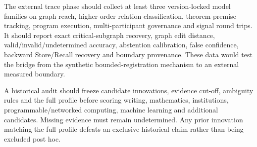 \documentclass[10pt]{article}
\begin{document}
The external trace phase should collect at least three version-locked model families on graph reach, higher-order relation classification, theorem-premise tracking, program execution, multi-participant governance and signal round trips. It should report exact critical-subgraph recovery, graph edit distance, valid/invalid/undetermined accuracy, abstention calibration, false confidence, backward Store/Recall recovery and boundary provenance. These data would test the bridge from the synthetic bounded-registration mechanism to an external measured boundary.

A historical audit should freeze candidate innovations, evidence cut-off, ambiguity rules and the full profile before scoring writing, mathematics, institutions, programmable/networked computing, machine learning and additional candidates. Missing evidence must remain undetermined. Any prior innovation matching the full profile defeats an exclusive historical claim rather than being excluded post hoc.

\enlargethispage{4\baselineskip}
\small


\end{document}
